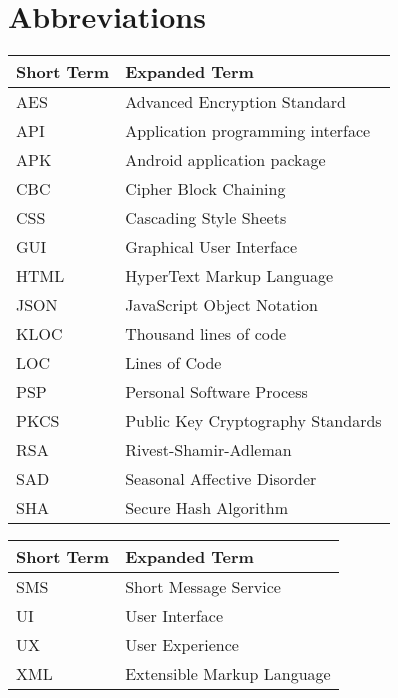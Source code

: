 \chapter{Abbreviations}




\begin{tabular}{p{40mm}|p{100mm}}
	\textbf{Short Term}&\textbf{Expanded Term}\\
	\hline
	
	AES		& Advanced Encryption Standard\\	
	API		& Application programming interface\\
	APK		& Android application package\\
	
	CBC 		& Cipher Block Chaining\\	
	CSS 		& Cascading Style Sheets\\
	
	GUI		& Graphical User Interface\\
	
	HTML 	& HyperText Markup Language\\
	
	JSON 	& JavaScript Object Notation\\
	
	KLOC	&	Thousand lines of code\\
	
	LOC		&	Lines of Code\\

	PSP		& 	Personal Software Process\\	
	
	PKCS 	& Public Key Cryptography Standards\\
	RSA		& Rivest-Shamir-Adleman\\
	
	SAD 		& Seasonal Affective Disorder\\
	SHA 		& Secure Hash Algorithm\\

\end{tabular}

\begin{tabular}{p{40mm}|p{100mm}}
	\textbf{Short Term}&\textbf{Expanded Term}\\
	\hline

	SMS 		& Short Message Service\\
	
	UI			& User Interface\\
	UX 		& User Experience\\	
	
	XML		& Extensible Markup Language\\

\end{tabular}